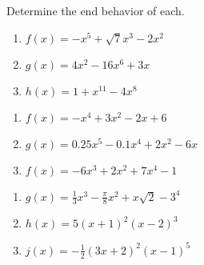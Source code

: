 Determine the end behavior of each.
\begin{multicols}{3}
\begin{enumerate}	\setcounter{enumi}{\value{Review}}
\item $f(x) = -x^5 + \sqrt{7}x^3 - 2x^2$
\item $g(x) = 4x^2 - 16x^6 + 3x$
\item $h(x) = 1 + x^{11} - 4x^8$
\end{enumerate}	\setcounter{Review}{\value{enumi}}
\end{multicols}
\begin{multicols}{3}
\begin{enumerate}	\setcounter{enumi}{\value{Review}} 
\item $f(x) = -x^4+3x^2-2x+6$
\item $g(x) = 0.25x^5-0.1x^4+2x^2-6x$
\item $f(x) = -6x^3 + 2x^2 + 7x^4 - 1$
\end{enumerate}	\setcounter{Review}{\value{enumi}}
\end{multicols}
\begin{multicols}{3}
\begin{enumerate}	\setcounter{enumi}{\value{Review}} 
\item $g(x) = \frac{1}{3}x^3 - \frac{\pi}{8}x^2 + x\sqrt{2} - 3^4$
\item $h(x) = 5(x+1)^2(x-2)^3$
\item $j(x) = -\frac{1}{2}\left(3x+2\right)^2(x-1)^5$
\end{enumerate}	\setcounter{Review}{\value{enumi}}
\end{multicols}
\bigskip

